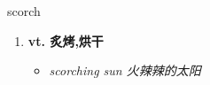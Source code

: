 
\begin{frame}
{\huge scorch}
\begin{center}
\begin{enumerate}\Large
  \item \textbf{vt. 炙烤,烘干}
  \begin{itemize}
    \item \em{\Large{scorching sun 火辣辣的太阳}}
  \end{itemize}
\end{enumerate}
\end{center}
\end{frame}
